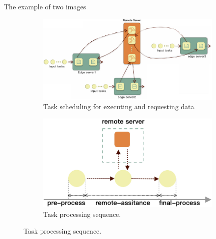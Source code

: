 \documentclass{beamer}%
\begin{document}
\begin{frame}{The example of two images}
	\begin{figure}[htb]
		\label{fig:example}
		\begin{subfigure}{.45\textwidth}
			\centering
			\includegraphics[width=\textwidth]{scheduling.jpg}
			\caption{Task scheduling for executing and requesting data}
			\label{fig:scheduling}
		\end{subfigure}
		\begin{subfigure}{.45\textwidth}
			\centering
			\includegraphics[width=\textwidth]{processing.jpg}
			\caption{Task processing sequence.}
			\label{fig:logob}
		\end{subfigure}
	\end{figure}
\end{frame}
\end{document}

